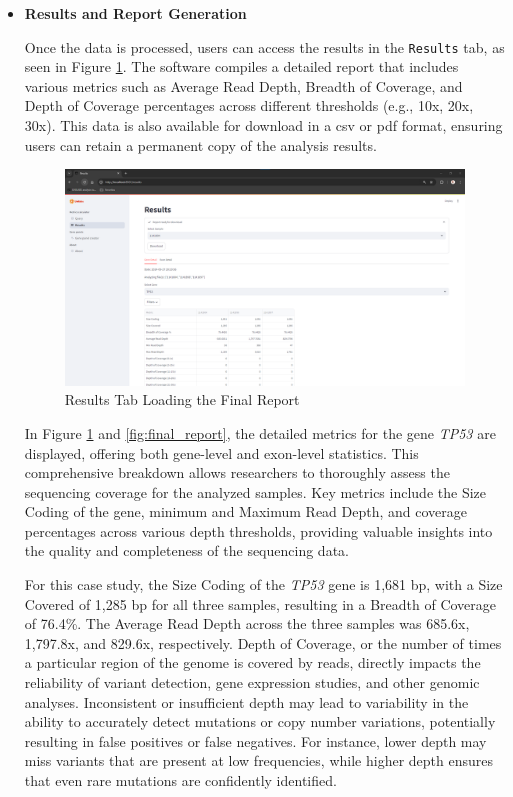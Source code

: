 \begin{itemize}
    \item \textbf{Results and Report Generation}

    Once the data is processed, users can access the results in the \texttt{Results} tab, as seen in Figure \ref{fig:results_loading}. The software compiles a detailed report that includes various metrics such as Average Read Depth, Breadth of Coverage, and Depth of Coverage percentages across different thresholds (e.g., 10x, 20x, 30x). This data is also available for download in a \ac{csv} or \ac{pdf} format, ensuring users can retain a permanent copy of the analysis results.
    
    \begin{figure}[H]
        \centering
        \includegraphics[width=\textwidth]{figs/v3.3.png}
        \caption{Results Tab Loading the Final Report}
        \label{fig:results_loading}
    \end{figure}
    
    In Figure \ref{fig:results_loading} and \ref{fig:final_report}, the detailed metrics for the gene \textit{TP53} are displayed, offering both gene-level and exon-level statistics. This comprehensive breakdown allows researchers to thoroughly assess the sequencing coverage for the analyzed samples. Key metrics include the Size Coding of the gene, minimum and Maximum Read Depth, and coverage percentages across various depth thresholds, providing valuable insights into the quality and completeness of the sequencing data.
    
    For this case study, the Size Coding of the \textit{TP53} gene is 1,681 \ac{bp}, with a Size Covered of 1,285 \ac{bp} for all three samples, resulting in a Breadth of Coverage of 76.4\%. The Average Read Depth across the three samples was 685.6x, 1,797.8x, and 829.6x, respectively. Depth of Coverage, or the number of times a particular region of the genome is covered by reads, directly impacts the reliability of variant detection, gene expression studies, and other genomic analyses. Inconsistent or insufficient depth may lead to variability in the ability to accurately detect mutations or copy number variations, potentially resulting in false positives or false negatives. For instance, lower depth may miss variants that are present at low frequencies, while higher depth ensures that even rare mutations are confidently identified. \cite{Larson2023}
    

\end{itemize}
